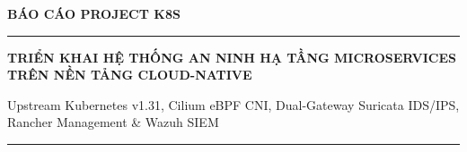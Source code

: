 \documentclass[12pt,a4paper]{report}
\begin{document}
\begin{titlepage}
    \centering
    \vspace*{2cm}
    
    {\Huge \bfseries \color{darkblue} BÁO CÁO PROJECT K8S \par}
    
    \vspace{1.5cm}
    \rule{\textwidth}{1.5pt}\par
    \vspace{0.8cm}
    
    {\Large \bfseries TRIỂN KHAI HỆ THỐNG AN NINH HẠ TẦNG MICROSERVICES TRÊN NỀN TẢNG CLOUD-NATIVE \par}
    \vspace{0.5cm}
    {\large Upstream Kubernetes v1.31, Cilium eBPF CNI, Dual-Gateway Suricata IDS/IPS, Rancher Management \& Wazuh SIEM \par}
    
    \vspace{0.8cm}
    \rule{\textwidth}{1.5pt}\par
    
    \vfill
    

    
    \vfill
    
\end{titlepage}

\tableofcontents
\newpage
\listoffigures
\listoftables
\newpage

\setcounter{page}{1}


\newpage


\newpage


\newpage


\end{document}
